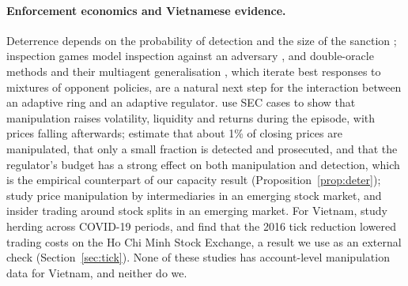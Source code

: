 \paragraph{Enforcement economics and Vietnamese evidence.} Deterrence depends on the probability of detection and the size of the sanction \citep{becker1968,polinsky2000}; inspection games model inspection against an adversary \citep{avenhaus2002}, and double-oracle methods \citep{mcmahan2003} and their multiagent generalisation \citep{lanctot2017}, which iterate best responses to mixtures of opponent policies, are a natural next step for the interaction between an adaptive ring and an adaptive regulator. \citet{aggarwal2006} use SEC cases to show that manipulation raises volatility, liquidity and returns during the episode, with prices falling afterwards; \citet{comerton2014} estimate that about 1\% of closing prices are manipulated, that only a small fraction is detected and prosecuted, and that the regulator's budget has a strong effect on both manipulation and detection, which is the empirical counterpart of our capacity result (Proposition~\ref{prop:deter}); \citet{khwaja2005} study price manipulation by intermediaries in an emerging stock market, and \citet{nguyen2017} insider trading around stock splits in an emerging market. For Vietnam, \citet{nguyen2023} study herding across COVID-19 periods, and \citet{vo2023} find that the 2016 tick reduction lowered trading costs on the Ho Chi Minh Stock Exchange, a result we use as an external check (Section~\ref{sec:tick}). None of these studies has account-level manipulation data for Vietnam, and neither do we.

